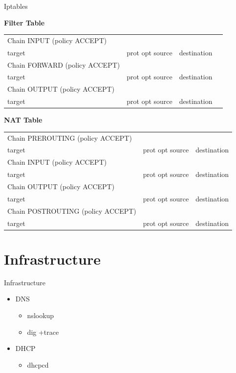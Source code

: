 \documentclass[aspectratio=169,10pt,t]{beamer}
\begin{document}
\begin{frame}[t]{Iptables}

	\textbf{Filter Table}
	\begin{tabular}{*{4}{l}}
		Chain INPUT (policy ACCEPT)&&&\\
		target&prot opt source&destination&\\

		Chain FORWARD (policy ACCEPT)\\
		target&prot opt source&destination&\\

		Chain OUTPUT (policy ACCEPT)\\
		target&prot opt source&destination&\\
	\end{tabular}

	\textbf{NAT Table}
	\begin{tabular}{*{3}{l}}
		Chain PREROUTING (policy ACCEPT)\\
		target&prot opt source&destination\\

		Chain INPUT (policy ACCEPT)\\
		target&prot opt source&destination\\

		Chain OUTPUT (policy ACCEPT)\\
		target&prot opt source&destination\\

		Chain POSTROUTING (policy ACCEPT)\\
		target&prot opt source&destination
	\end{tabular}
	
\end{frame}

\section{Infrastructure}%
\label{sec:routing}


\begin{frame}[t]{Infrastructure}
	\begin{itemize}
		\item DNS
			\begin{itemize}
				\item nslookup
				\item dig +trace
			\end{itemize}
		\item DHCP
			\begin{itemize}
				\item dhcpcd
			\end{itemize}
	\end{itemize}
\end{frame}
\end{document}
